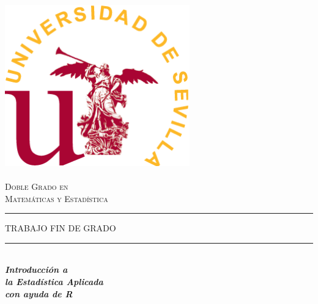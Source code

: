 \begin{titlepage}

\newcommand{\HRule}{\rule{\linewidth}{0.5mm}} %

\center %


\begin{minipage}{14cm}
\center

\includegraphics[width=8cm,height=8cm]{logo}\\[0.5cm] %


\textsc{\LARGE Doble Grado en \\[0.2cm]
Matemáticas y Estadística}\\[2.3cm] 



\rule[1.7mm]{2cm}{0.5mm}
\hfill
\textsc{\Large TRABAJO FIN DE GRADO} 
\hfill
\rule[1.7mm]{2cm}{0.5mm} 
\\[0.75cm]

{\Huge
\textbf{\textit{
Introducción a \\[0.2cm]
la Estadística Aplicada \\[0.5cm]
con ayuda de R
}}}\\[0.75cm] 


\end{minipage}
\end{titlepage}
